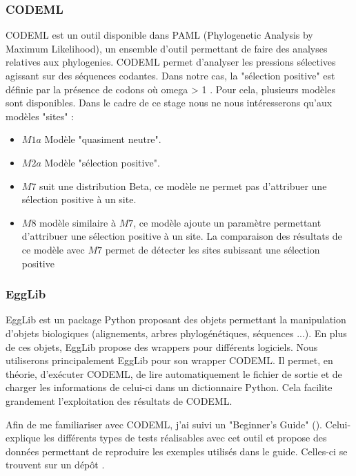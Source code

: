 \documentclass[../main]{subfiles} %
\begin{document}
\subsubsection{CODEML}
\label{sec:CODEML}
\gls{CODEML} est un outil disponible dans \gls{PAML} (Phylogenetic Analysis by Maximum Likelihood), un ensemble d'outil permettant de faire des analyses relatives aux \glspl{phylogenie}. \gls{CODEML} permet d'analyser les pressions sélectives agissant sur des séquences codantes. Dans notre cas, la "sélection positive" est définie par la présence de \glspl{codon} où \acrshort{omega} > 1  \cite{alvarez-carretero_beginners_2023}. Pour cela, plusieurs modèles sont disponibles. Dans le cadre de ce stage nous ne nous intéresserons qu'aux modèles "sites" :
\begin{itemize}
    \item $M1a$ Modèle "quasiment neutre".  \cite{alvarez-carretero_beginners_2023}
    \item $M2a$ Modèle "sélection positive". \cite{alvarez-carretero_beginners_2023}
    \item $M7$ suit une distribution Beta, ce modèle ne permet pas d'attribuer une sélection positive à un site. \cite{yang_codon-substitution_2000}
    \item $M8$ modèle similaire à $M7$, ce modèle ajoute un paramètre permettant d'attribuer une sélection positive à un site. La comparaison des résultats de ce modèle avec $M7$ permet de détecter les sites subissant une sélection positive \cite{yang_codon-substitution_2000}

\end{itemize}


\subsubsection{EggLib}
\label{sec:EggLib}
\gls{EggLib} est un package \gls{Python} proposant des objets permettant la manipulation d'objets biologiques (alignements, arbres phylogénétiques, séquences ...). En plus de ces objets, \gls{EggLib} propose des \glspl{wrapper} pour différents logiciels. Nous utiliserons principalement \gls{EggLib} pour son \gls{wrapper} \gls{CODEML}. Il permet, en théorie, d'exécuter \gls{CODEML}, de lire automatiquement le fichier de sortie et de charger les informations de celui-ci dans un dictionnaire \gls{Python}. Cela facilite grandement l'exploitation des résultats de \gls{CODEML}.

\label{sec:FamiCodeml}
Afin de me familiariser avec \gls{CODEML}, j'ai suivi un "Beginner's Guide" (\cite{alvarez-carretero_beginners_2023}). Celui-explique les différents types de tests réalisables avec cet outil et propose des données permettant de reproduire les exemples utilisés dans le guide. Celles-ci se trouvent sur un dépôt \GitHub \cite{noauthor_paml-tutorialpositive-selection_nodate}.
\end{document}
